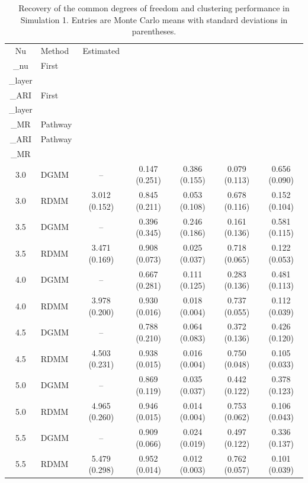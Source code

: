 \begin{table}[!ht]
\centering
\caption{Recovery of the common degrees of freedom and clustering performance in Simulation 1. Entries are Monte Carlo means with standard deviations in parentheses.}
\label{tab:study1-results}
\begin{tabular}{c l c c c c c}
\hline
Nu & Method & Estimated\\_nu & First\\_layer\\_ARI & First\\_layer\\_MR & Pathway\\_ARI & Pathway\\_MR \\
\hline
3.0 & DGMM & -- & 0.147 (0.251) & 0.386 (0.155) & 0.079 (0.113) & 0.656 (0.090) \\
3.0 & RDMM & 3.012 (0.152) & 0.845 (0.211) & 0.053 (0.108) & 0.678 (0.116) & 0.152 (0.104) \\
3.5 & DGMM & -- & 0.396 (0.345) & 0.246 (0.186) & 0.161 (0.136) & 0.581 (0.115) \\
3.5 & RDMM & 3.471 (0.169) & 0.908 (0.073) & 0.025 (0.037) & 0.718 (0.065) & 0.122 (0.053) \\
4.0 & DGMM & -- & 0.667 (0.281) & 0.111 (0.125) & 0.283 (0.136) & 0.481 (0.113) \\
4.0 & RDMM & 3.978 (0.200) & 0.930 (0.016) & 0.018 (0.004) & 0.737 (0.055) & 0.112 (0.039) \\
4.5 & DGMM & -- & 0.788 (0.210) & 0.064 (0.083) & 0.372 (0.136) & 0.426 (0.120) \\
4.5 & RDMM & 4.503 (0.231) & 0.938 (0.015) & 0.016 (0.004) & 0.750 (0.048) & 0.105 (0.033) \\
5.0 & DGMM & -- & 0.869 (0.119) & 0.035 (0.037) & 0.442 (0.122) & 0.378 (0.123) \\
5.0 & RDMM & 4.965 (0.260) & 0.946 (0.015) & 0.014 (0.004) & 0.753 (0.062) & 0.106 (0.043) \\
5.5 & DGMM & -- & 0.909 (0.066) & 0.024 (0.019) & 0.497 (0.122) & 0.336 (0.137) \\
5.5 & RDMM & 5.479 (0.298) & 0.952 (0.014) & 0.012 (0.003) & 0.762 (0.057) & 0.101 (0.039) \\
\hline
\end{tabular}
\end{table}
